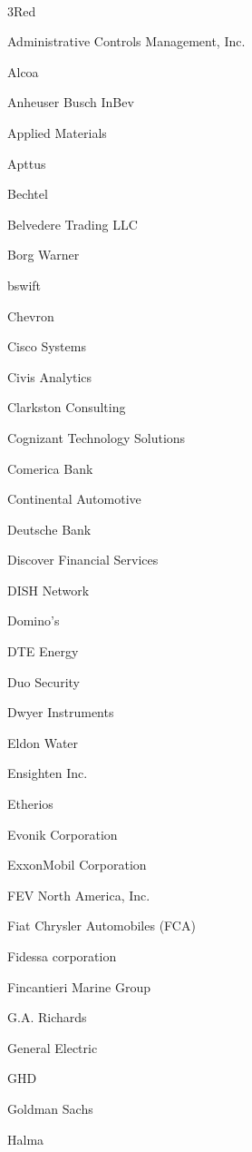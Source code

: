 \documentclass[twoside]{article}
\begin{document}
\begin{center}
\begin{multicols}{5}
        \vspace{-1em}
        ~\hrulefill~
        \vspace{-.9em}
        \begin{FlushLeft}
        \begin{compactitem}
        \item 3Red
\item Administrative Controls Management, Inc.
\item Alcoa
\item Anheuser Busch InBev
\item Applied Materials
\item Apttus
\item Bechtel
\item Belvedere Trading LLC
\item Borg Warner
\item bswift
\item Chevron
\item Cisco Systems
\item Civis Analytics
\item Clarkston Consulting
\item Cognizant Technology Solutions
\item Comerica Bank
\item Continental Automotive
\item Deutsche Bank
\item Discover Financial Services
\item DISH Network
\item Domino's
\item DTE Energy
\item Duo Security
\item Dwyer Instruments
\item Eldon Water
\item Ensighten Inc.
\item Etherios
\item Evonik Corporation
\item ExxonMobil Corporation
\item FEV North America, Inc.
\item Fiat Chrysler Automobiles (FCA)
\item Fidessa corporation
\item Fincantieri Marine Group
\item G.A. Richards
\item General Electric
\item GHD
\item Goldman Sachs
\item Halma

\end{compactitem}
\end{FlushLeft}
\end{multicols}
\end{center}
\end{document}
